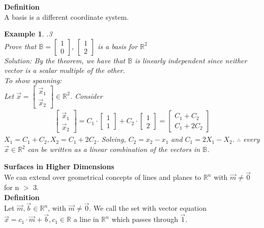 \documentclass{letter}
\newcounter{Theorem}
\newtheorem{example}{Example}[Theorem]
\begin{document}
\textbf{Definition} \\
A basis is a different coordinate system. 
\begin{example} .3\\
Prove that $\mathbb{B} = \left [\begin{matrix}
    1 \\ 0
\end{matrix}\right]$,
$\left[\begin{matrix}
    1 \\ 2
\end{matrix}\right]$ is a basis for $\mathbb{R}^2$ \\
Solution: By the theorem, we have that $\mathbb{B}$ is linearly independent since neither vector is a scalar multiple of the other.
\\
To show spanning: \\
Let $\vec{x} = \left [\begin{matrix}
    \vec{x}_1 \\ \vec{x}_2
\end{matrix}\right] \in \mathbb{R}^2$. Consider
\begin{align*}
\left [\begin{matrix}
    \vec{x}_1 \\ \vec{x}_2
\end{matrix}\right] = C_1 \cdot \left [\begin{matrix}
    1 \\ 1
\end{matrix}\right] + C_2 \cdot \left [\begin{matrix}
    1 \\ 2
\end{matrix}\right] = \left [\begin{matrix}
    C_1 + C_2 \\ C_1 + 2 C_2
\end{matrix}\right]
\end{align*}
$X_1 = C_1 + C_2, X_2 = C_1 + 2 C_2$. Solving, $C_2 = x_2 - x_1$ and $C_1 = 2 X_1 - X_2$. $\therefore$ every $\vec{x} \in \mathbb{R}^2 $ can be written as a linear combination of the vectors in $\mathbb{B}$.
\end{example}

\Large{\textbf{Surfaces in Higher Dimensions}} \\
We can extend over geometrical concepts of lines and planes to $\mathbb{R}^n$ with $\vec{m} \neq \vec{0}$ for n $>$ 3. \\

\textbf{Definition} \\
Let $\vec{m}, \vec{b} \in \mathbb{R}^n$, with $\vec{m} \neq \vec{0}$. We call the set with vector equation $\vec{x} = c_1 \cdot \vec{m} + \vec{b}, c_1 \in \mathbb{R}$ a line in $\mathbb{R}^n$ which passes through $\vec{1}$.
\end{document}

